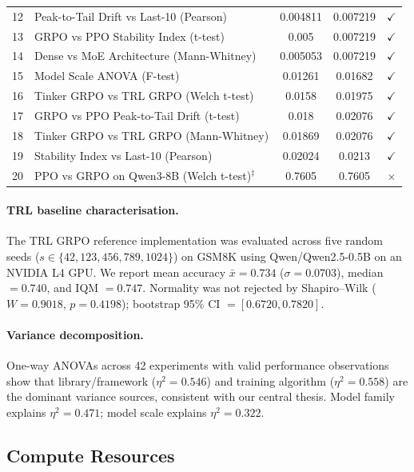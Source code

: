 \documentclass{article}
\begin{document}
\begin{table}[!ht]
\begin{tabular}{@{}rp{6.2cm}ccc@{}}
        12 & Peak-to-Tail Drift vs Last-10 (Pearson) & 0.004811 & 0.007219 & $\checkmark$ \\
        13 & GRPO vs PPO Stability Index (t-test) & 0.005 & 0.007219 & $\checkmark$ \\
        14 & Dense vs MoE Architecture (Mann-Whitney) & 0.005053 & 0.007219 & $\checkmark$ \\
        15 & Model Scale ANOVA (F-test) & 0.01261 & 0.01682 & $\checkmark$ \\
        16 & Tinker GRPO vs TRL GRPO (Welch t-test) & 0.0158 & 0.01975 & $\checkmark$ \\
        17 & GRPO vs PPO Peak-to-Tail Drift (t-test) & 0.018 & 0.02076 & $\checkmark$ \\
        18 & Tinker GRPO vs TRL GRPO (Mann-Whitney) & 0.01869 & 0.02076 & $\checkmark$ \\
        19 & Stability Index vs Last-10 (Pearson) & 0.02024 & 0.0213 & $\checkmark$ \\
        20 & PPO vs GRPO on Qwen3-8B (Welch t-test)$^{\ddag}$ & 0.7605 & 0.7605 & $\times$ \\
\bottomrule
\end{tabular}
\end{table}

\paragraph{TRL baseline characterisation.}
The TRL GRPO reference implementation was evaluated across five random seeds
($s \in \{42, 123, 456, 789, 1024\}$) on GSM8K using Qwen/Qwen2.5-0.5B on
an NVIDIA L4 GPU. We report mean accuracy $\bar{x} = 0.734$ ($\sigma = 0.0703$),
median $= 0.740$, and IQM $= 0.747$. Normality was not rejected by Shapiro--Wilk
($W = 0.9018$, $p = 0.4198$); bootstrap 95\% CI $= [0.6720, 0.7820]$.

\paragraph{Variance decomposition.}
One-way ANOVAs across 42 experiments with valid performance observations show
that library/framework ($\eta^2 = 0.546$) and training algorithm ($\eta^2 = 0.558$)
are the dominant variance sources, consistent with our central thesis. Model
family explains $\eta^2 = 0.471$; model scale explains $\eta^2 = 0.322$.

\subsection{Compute Resources}
\end{document}
